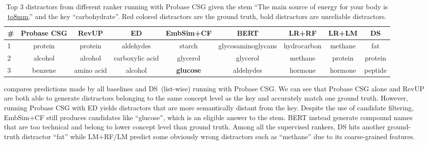 \begin{table}[ht!]%
	\small
	\centering
		\begin{tabular}{lcccccccc} %
			\toprule
			\# &Probase CSG  &RevUP &ED  & EmbSim+CF &BERT & LR+RF & LR+LM & \textbf{DS}\\
			\midrule
			1 &\color{red}protein   &\color{red}protein  &aldehydes  &starch &glycosaminoglycans  & hydrocarbon &methane    &\color{red} fat\\
			\midrule
			2 &alcohol  &alcohol  &carboxylic acid  &glycerol  &glycerol &methane  &\color{red}protein    &\color{red}protein \\
			\midrule
			3 &benzene  &amino acid  &alcohol   &\textbf{glucose}  &aldehydes &hormone  &hormone   &peptide \\
			\bottomrule
		\end{tabular}
		\caption{Top 3 distractors from different ranker running with Probase CSG
	given the stem ``The main source of energy for your body is \underline{\hbox to8mm{}}.'' and the key ``{\color{blue}carbohydrate}''. Red colored distractors are the ground truth, bold distractors are unreliable distractors.}
		\label{table:example}
	\end{table}
 compares predictions made by all baselines and DS~(list-wise) running with Probase CSG. We can see that Probase CSG alone and RevUP are both able to generate distractors belonging to the same concept level as the key and accurately match one ground truth. However, running Probase CSG with ED yields 
distractors that are more semantically distant from the key. 
Despite the use of candidate filtering, EmbSim+CF still produces candidates 
like ``glucose'', which is an eligible answer to the stem. 
BERT instead generate compound names that are too technical and belong to lower concept level than ground truth. 
Among all the supervised rankers, DS hits another ground-truth distractor 
``fat'' while LM+RF/LM predict some obviously wrong distractors 
such as ``methane'' due to its coarse-grained features.


